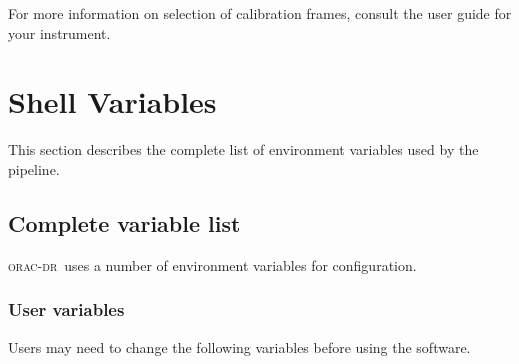 \documentclass[twoside,11pt]{article}
\newcommand{\xlabel}[1]{}
\renewcommand{\_}{\texttt{\symbol{95}}}
\newcommand{\oracdr}{\textsc{orac-dr}}
\begin{document}
For more information on selection of calibration frames, consult the
user guide for your instrument.


\section{Shell Variables\label{Shell_Variables}\xlabel{shell_variables}}

This section describes the complete list of environment variables
used by the pipeline.

\subsection*{Complete variable list\label{Shell_Variables_Complete_variable_list}}

\oracdr\ uses a number of environment variables for configuration.

\subsubsection*{User variables\label{Shell_Variables_User_variables}}

Users may need to change the following variables before using the
software.
\end{document}
